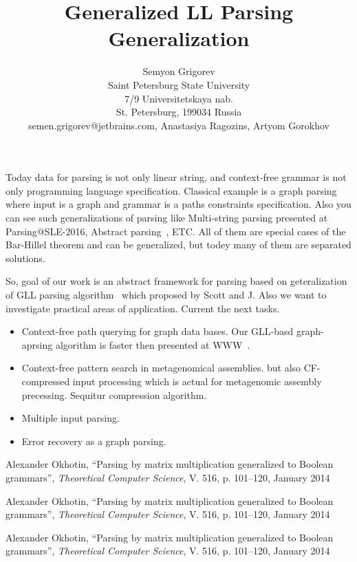 \documentclass[12pt]{article}  %
\title{Generalized LL Parsing Generalization}
\author{Semyon Grigorev
\\
       {Saint Petersburg State University}\\
       {7/9 Universitetskaya nab.}\\
       {St. Petersburg, 199034 Russia}\\
       {semen.grigorev@jetbrains.com}, 
       Anastasiya Ragozins, Artyom Gorokhov}
\theoremstyle{definition}
\theoremstyle{remark}
\begin{document}
\maketitle

Today data for parsing is not only linear string, and context-free grammar is not only programming language specification.
Classical example is a graph parsing where input is a graph and grammar is a paths constraints specification.
Also you can see such generalizations of parsing like Multi-string parsing presented at Parsing@SLE-2016, Abstract parsing~\cite{AbstractParsing}, ETC.
All of them are special cases of the Bar-Hillel theorem and can be generalized, but todey many of them are separated solutions.

So, goal of our work is an abstract framework for parsing based on geteralization of GLL parsing 
algorithm~\cite{GLL} which proposed by Scott and J. Also we want to investigate practical areas of 
application. Current the next tasks.
\begin{itemize}
\item Context-free path querying for graph data bases. 
Our GLL-basd graph-aprsing algorithm is faster then presented at WWW~\cite{CFRDFParsing}.  
\item Context-free pattern search in metagenomical assemblies. but also CF-compressed input processing which is actual for metagenomic assembly precessing. 
Sequitur compression algorithm.
\item Multiple input parsing. 
\item Error recovery as a graph parsing. 
\end{itemize}

\begin{thebibliography}{9}

  Alexander Okhotin,
  ``Parsing by matrix multiplication generalized to Boolean grammars'',
  \emph{Theoretical Computer Science},
  V. 516,
  p. 101--120,
  January 2014

  Alexander Okhotin,
  ``Parsing by matrix multiplication generalized to Boolean grammars'',
  \emph{Theoretical Computer Science},
  V. 516,
  p. 101--120,
  January 2014

  Alexander Okhotin,
  ``Parsing by matrix multiplication generalized to Boolean grammars'',
  \emph{Theoretical Computer Science},
  V. 516,
  p. 101--120,
  January 2014

\end{thebibliography}
\end{document}
